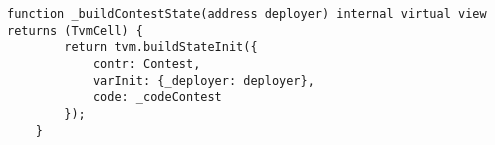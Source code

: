\begin{lstlisting}[firstnumber=16]
    function _buildContestState(address deployer) internal virtual view returns (TvmCell) {
        return tvm.buildStateInit({
            contr: Contest,
            varInit: {_deployer: deployer},
            code: _codeContest
        });
    }
\end{lstlisting}

